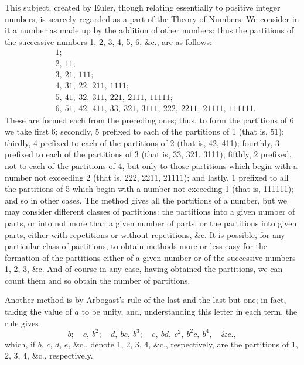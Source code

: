 \documentclass[11pt,a4paper]{article}
\begin{document}
This subject, created by Euler, though relating essentially to positive integer numbers, is scarcely regarded as a part of the Theory of Numbers. We consider in it a number as made up by the addition of other numbers: thus the partitions of the successive numbers 1, 2, 3, 4, 5, 6, \&c., are as follows:
\begin{align*}
&1;\\
&2, \ 11;\\
&3, \ 21, \ 111;\\
&4, \ 31, \ 22, \ 211, \ 1111;\\
&5, \ 41, \ 32, \ 311, \ 221, \ 2111, \ 11111;\\
&6, \ 51, \ 42, \ 411, \ 33, \ 321, \ 3111, \ 222, \ 2211, \ 21111, \ 111111.
\end{align*}
These are formed each from the preceding ones; thus, to form the partitions of 6 we take first 6; secondly, 5 prefixed to each of the partitions of 1 (that is, 51); thirdly, 4 prefixed to each of the partitions of 2 (that is, 42, 411); fourthly, 3 prefixed to each of the partitions of 3 (that is, 33, 321, 3111); fifthly, 2 prefixed, not to each of the partitions of 4, but only to those partitions which begin with a number not exceeding 2 (that is, 222, 2211, 21111); and lastly, 1 prefixed to all the partitions of 5 which begin with a number not exceeding 1 (that is, 111111); and so in other cases. The method gives all the partitions of a number, but we may consider different classes of partitions: the partitions into a given number of parts, or into not more than a given number of parts; or the partitions into given parts, either with repetitions or without repetitions, \&c. It is possible, for any particular class of partitions, to obtain methods more or less easy for the formation of the partitions either of a given number or of the successive numbers 1, 2, 3, \&c. And of course in any case, having obtained the partitions, we can count them and so obtain the number of partitions.

Another method is by Arbogast's rule of the last and the last but one; in fact, taking the value of $a$ to be unity, and, understanding this letter in each term, the rule gives
\[
b; \quad c,\ b^{2}; \quad d,\ bc,\ b^{3}; \quad e,\ bd,\ c^{2},\ b^{2}c,\ b^{4}, \quad \&c.,
\]
which, if $b$, $c$, $d$, $e$, \&c., denote 1, 2, 3, 4, \&c., respectively, are the partitions of 1, 2, 3, 4, \&c., respectively.
\end{document}
